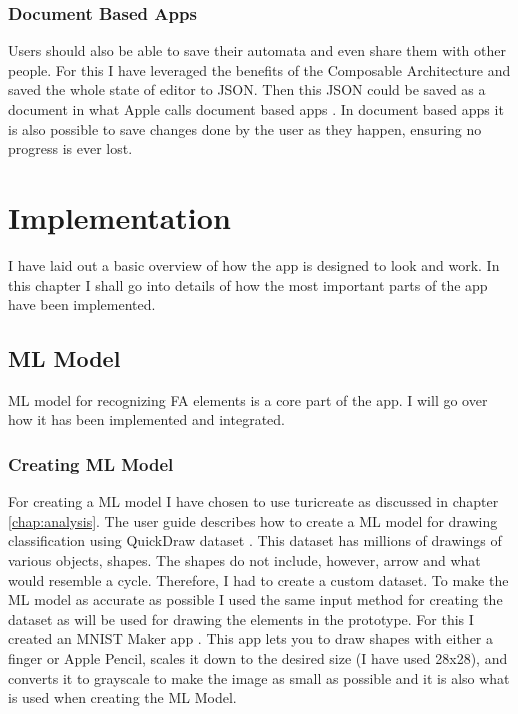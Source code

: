 \subsection{Document Based Apps}

Users should also be able to save their automata and even share them with other people. For this I have leveraged the benefits of the Composable Architecture and saved the whole state of editor to JSON. Then this JSON could be saved as a document in what Apple calls document based apps \cite{document-based}. In document based apps it is also possible to save changes done by the user as they happen, ensuring no progress is ever lost.

\chapter{Implementation}
\label{chap:implementation}

I have laid out a basic overview of how the app is designed to look and work. In this chapter I shall go into details of how the most important parts of the app have been implemented.

\section{ML Model}

ML model for recognizing FA elements is a core part of the app. I will go over how it has been implemented and integrated.

\subsection{Creating ML Model}

For creating a ML model I have chosen to use turicreate \cite{turicreate} as discussed in chapter \ref{chap:analysis}. The user guide \cite{drawing-classification} describes how to create a ML model for drawing classification using QuickDraw dataset \cite{quickdraw}. This dataset has millions of drawings of various objects, shapes. The shapes do not include, however, arrow and what would resemble a cycle. Therefore, I had to create a custom dataset. To make the ML model as accurate as possible I used the same input method for creating the dataset as will be used for drawing the elements in the prototype. For this I created an MNIST Maker app \cite{mnist-maker}. This app lets you to draw shapes with either a finger or Apple Pencil, scales it down to the desired size (I have used 28x28), and converts it to grayscale to make the image as small as possible and it is also what is used when creating the ML Model.

